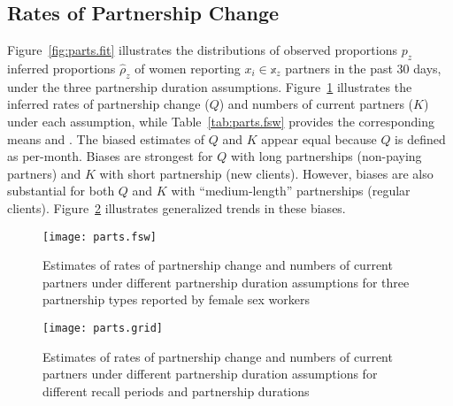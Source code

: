 \subsection{Rates of Partnership Change}\label{res.parts}
Figure~\ref{fig:parts.fit} illustrates the distributions of
observed proportions $p_z$ \vs inferred proportions $\hat{\rho}_z$ of women
reporting $x_i \in \mathbb{x}_z$ partners in the past 30 days,
under the three partnership duration assumptions.
Figure~\ref{fig:parts.fsw} illustrates the inferred  %
rates of partnership change ($Q$) and numbers of current partners ($K$) under each assumption,
while Table~\ref{tab:parts.fsw} provides the corresponding means and \ci.
The biased estimates of $Q$ and $K$ appear equal because $Q$ is defined as per-month. %
Biases are strongest for %
$Q$ with long partnerships (\eg non-paying partners) and
$K$ with short partnership (\eg new clients).
However, biases are also substantial for  %
both $Q$ and $K$ with ``medium-length'' partnerships (\eg regular clients).
Figure~\ref{fig:parts.grid} illustrates generalized trends in these biases.
\begin{figure}
  \centering\texttt{[image: parts.fsw]}
  \caption{Estimates of rates of partnership change and numbers of current partners
    under different partnership duration assumptions
    for three partnership types reported by female sex workers}
  \label{fig:parts.fsw}
\end{figure}
\begin{figure}
  \centering\texttt{[image: parts.grid]}
  \caption{Estimates of rates of partnership change and numbers of current partners
    under different partnership duration assumptions
    for different recall periods and partnership durations}
  \label{fig:parts.grid}
\end{figure}
